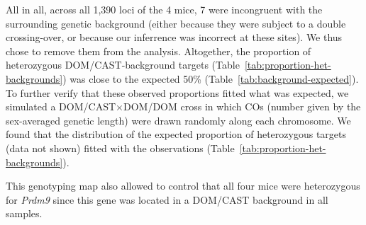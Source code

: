 \begin{mccorrection}
%

All in all, across all 1,390 loci of the 4 mice, 7 were incongruent with the surrounding genetic background (either because they were subject to a double crossing-over, or because our inferrence was incorrect at these sites). We thus chose to remove them from the analysis.
Altogether, the proportion of heterozygous DOM/CAST-background targets (Table~\ref{tab:proportion-het-backgrounds}) was close to the expected 50\% (Table~\ref{tab:background-expected}).
To further verify that these observed proportions fitted what was expected, we simulated a DOM/CAST$\times$DOM/DOM cross in which COs (number given by the sex-averaged genetic length) were drawn randomly along each chromosome. We found that the distribution of the expected proportion of heterozygous targets (data not shown) fitted with the observations (Table~\ref{tab:proportion-het-backgrounds}).

This genotyping map also allowed to control that all four mice were heterozygous for \textit{Prdm9} since this gene was located in a DOM/CAST background in all samples.

\end{mccorrection}



